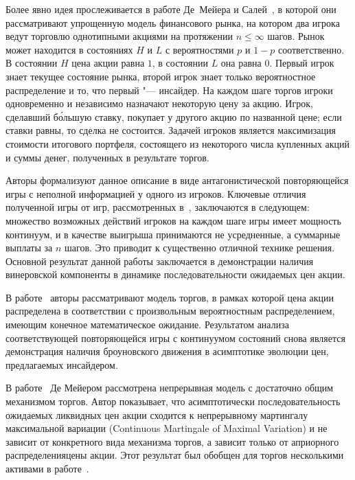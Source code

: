 Более явно идея прослеживается в работе Де~Мейера и Салей~\cite{demeyer02}, в которой они рассматривают упрощенную модель финансового рынка, на котором два
игрока ведут торговлю однотипными акциями на протяжении $n \leq \infty$ шагов.
Рынок может находится в состояниях $H$ и $L$ с вероятностями $p$ и $1-p$ соответственно.
В состоянии $H$ цена акции равна $1$, в состоянии $L$ она равна $0$.
Первый игрок знает текущее состояние рынка, второй игрок знает только вероятностное распределение и то, что первый "--- инсайдер.
На каждом шаге торгов игроки одновременно и независимо назначают некоторую цену за акцию.
Игрок, сделавший б\'{о}льшую ставку, покупает у другого акцию по названной цене; если ставки равны, то сделка не состоится.
Задачей игроков является максимизация стоимости итогового портфеля, состоящего из некоторого числа купленных акций и суммы денег, полученных в результате торгов.

Авторы формализуют данное описание в виде антагонистической повторяющейся игры с неполной информацией у одного из игроков.
Ключевые отличия полученной игры от игр, рассмотренных в~\cite{aumann95}, заключаются в следующем: множество возможных действий игроков на каждом шаге игры имеет мощность континуум, и в качестве выигрыша принимаются не усредненные, а суммарные выплаты за $n$ шагов.
Это приводит к существенно отличной технике решения. Основной результат данной работы заключается в демонстрации наличия винеровской компоненты в динамике последовательности ожидаемых цен акции.

В работе~\cite{demeyer02c} авторы рассматривают модель торгов, в рамках которой цена акции распределена в соответствии с произвольным вероятностным распределением, имеющим конечное математическое ожидание.
Результатом анализа соответствующей повторяющейся игры с континуумом состояний снова является демонстрация наличия броуновского движения в асимптотике эволюции цен, предлагаемых инсайдером.

В работе~\cite{demeyer10} Де Мейером рассмотрена непрерывная модель с достаточно общим механизмом торгов.
Автор показывает, что асимптотически последовательность ожидаемых ликвидных цен акции сходится к непрерывному мартингалу максимальной
вариации (Continuous Martingale of Maximal Variation) и не зависит от конкретного вида механизма торгов, а зависит только от априорного распределенияцены акции.
Этот результат был обобщен для торгов несколькими активами в работе~\cite{gensbittel15}.


